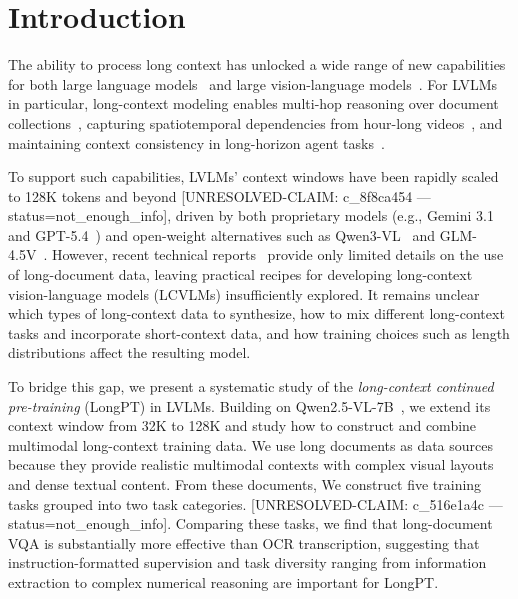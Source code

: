 \documentclass{llmxive}
\providecommand{\emph}[1]{\textit{#1}}
\begin{document}
\section{Introduction}
\label{sec:introduction}
The ability to process long context has unlocked a wide range of new capabilities for both large language models~\citep[LLMs;][]{yang2025qwen3,llama4} and large vision-language models~\citep[LVLMs;][]{bai2025qwen3,seed2_0}.
For LVLMs in particular, long-context modeling enables multi-hop reasoning over document collections~\citep{wang2025mmlongbench,wang2024multimodal}, capturing spatiotemporal dependencies from hour-long videos~\citep{wu2024longvideobench,fu2025video}, and maintaining context consistency in long-horizon agent tasks~\citep{geng2025webwatcher,zhang2026browsecomp,zhang2026clawbench}.

To support such capabilities, LVLMs' context windows have been rapidly scaled to 128K tokens and beyond [UNRESOLVED-CLAIM: c_8f8ca454 — status=not_enough_info], driven by both proprietary models (e.g., Gemini 3.1~\citep{gemini_3_1_pro_2026} and GPT-5.4~\citep{openai2026introducing_gpt5_4}) and open-weight alternatives such as Qwen3-VL~\citep{bai2025qwen3} and GLM-4.5V~\citep{hong2025glm}.
However, recent technical reports~\citep{bai2025qwen3,hong2025glm} provide only limited details on the use of long-document data, leaving practical recipes for developing long-context vision-language models (LCVLMs) insufficiently explored.
It remains unclear which types of long-context data to synthesize, how to mix different long-context tasks and incorporate short-context data, and how training choices such as length distributions affect the resulting model.

To bridge this gap, we present a systematic study of the \emph{long-context continued pre-training} (LongPT) in LVLMs.
Building on Qwen2.5-VL-7B~\citep{bai2025qwen2}, we extend its context window from 32K to 128K and study how to construct and combine multimodal long-context training data.
We use long documents as data sources because they provide realistic multimodal contexts with complex visual layouts and dense textual content.
From these documents, We construct five training tasks grouped into two task categories. [UNRESOLVED-CLAIM: c_516e1a4c — status=not_enough_info].
Comparing these tasks, we find that long-document VQA is substantially more effective than OCR transcription, suggesting that instruction-formatted supervision and task diversity ranging from information extraction to complex numerical reasoning are important for LongPT.
\end{document}

